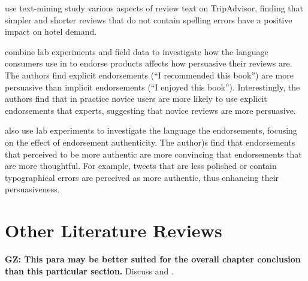 \documentclass[letter,12pt]{article}
\begin{document}
\citet{ghose2012designing} use text-mining study various aspects of review
text on TripAdvisor, finding that simpler and shorter reviews that do not
contain spelling errors have a positive impact on hotel demand.

\citet{packard2017language} combine lab experiments and field data to
investigate how the language consumers use in to endorse products affects how
persuasive their reviews are. The authors find explicit endorsements (``I
recommended this book'') are more persuasive than implicit endorsements (``I
enjoyed this book''). Interestingly, the authors find that in practice novice
users are more likely to use explicit endorsements that experts, suggesting
that novice reviews are more persuasive.

\citet{kupor2017spontaneous} also use lab experiments to investigate the
language the endorsements, focusing on the effect of endorsement authenticity.
The author)s find that endorsements that perceived to be more authentic are
more convincing that endorsements that are more thoughtful. For example,
tweets that are less polished or contain typographical errors are perceived as
more authentic, thus enhancing their persuasiveness.

\section{Other Literature Reviews}

\textbf{GZ: This para may be better suited for the overall chapter conclusion
than this particular section.} Discuss \citet{dellarocas2003digitization} and
\citet{luca2015user}.

\printbibliography
\end{document}
